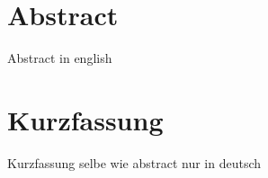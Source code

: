 {\chapter*{Abstract}}

Abstract in english


{\chapter*{Kurzfassung}}
\begin{german}
  Kurzfassung selbe wie abstract nur in deutsch
\end{german}
